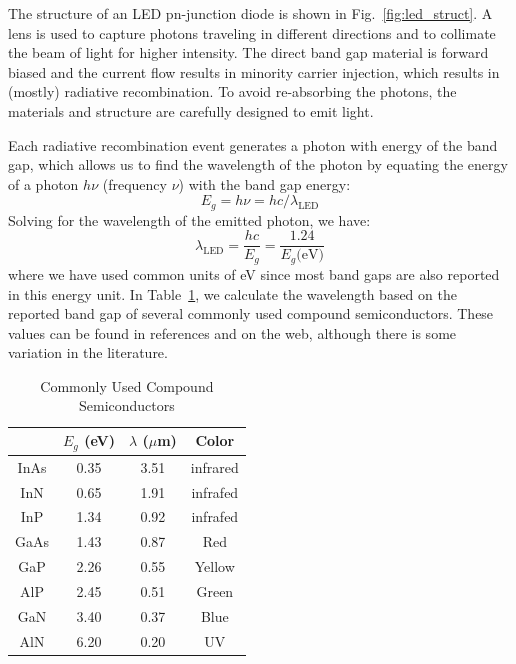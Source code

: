 The structure of an LED pn-junction diode is shown in Fig.~\ref{fig:led_struct}.  A lens is used to capture photons traveling in different directions and to collimate the beam of light for higher intensity.    The direct band gap material is forward biased and the current flow results in minority carrier injection, which results in (mostly) radiative recombination.  To avoid re-absorbing the photons, the materials and structure are carefully designed to emit light. 

Each radiative recombination event generates a photon with energy of the band gap, which allows us to find the wavelength of the photon by equating the energy of a photon $h \nu$ (frequency $\nu$) with the band gap energy:
\begin{equation} 
	E_g = h \nu = h c / \lambda_{\text{LED}} 
\end{equation}
%
Solving for the wavelength of the emitted photon, we have:
\begin{equation} 
	\lambda_{\text{LED}} = \frac{hc}{E_g} = \frac{1.24}{E_g \text{(eV)}}
\end{equation}
where we have used common units of eV since most band gaps are also reported in this energy unit.  In Table~\ref{tab:rainbow}, we calculate the wavelength based on the reported band gap of several commonly used compound semiconductors.  These values can be found in references and on the web, although there is some variation in the literature.


\begin{table}[htbp]
\begin{center}
  \caption{Commonly Used Compound Semiconductors}
    \begin{tabular}{cccc}
    \toprule
    & $E_g$ (eV) & $\lambda$ ($\mu$m) & \textbf{Color} \\
    \midrule
    \rowcolor[rgb]{ .851,  .851,  .851} InAs  & 0.35  & 3.51  & infrared \\
    InN   & 0.65  & 1.91  & infrafed \\
    \rowcolor[rgb]{ .851,  .851,  .851} InP   & 1.34  & 0.92  & infrafed \\
    GaAs  & 1.43  & 0.87  & Red \\
    \rowcolor[rgb]{ .851,  .851,  .851} GaP   & 2.26  & 0.55  & Yellow \\
    AlP   & 2.45  & 0.51  & Green \\
    \rowcolor[rgb]{ .851,  .851,  .851} GaN   & 3.40  & 0.37  & Blue \\
    AlN   & 6.20  & 0.20  & UV \\
    \bottomrule
    \end{tabular}%
  \label{tab:rainbow}%
\end{center}
\end{table}%


